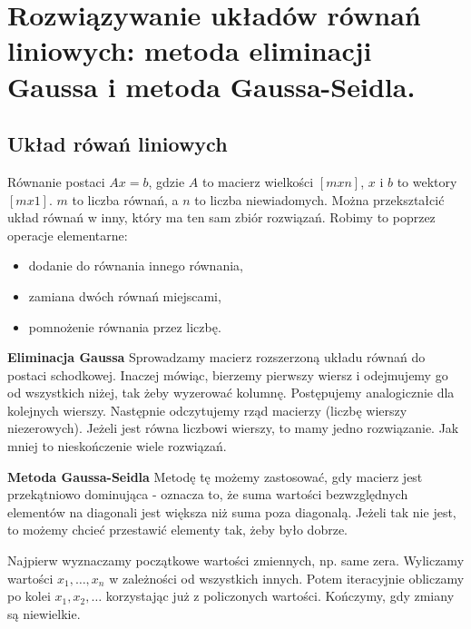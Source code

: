 \section{Rozwiązywanie układów równań liniowych: metoda eliminacji Gaussa i metoda Gaussa-Seidla.}

\subsection{Układ rówań liniowych}

Równanie postaci $Ax=b$, gdzie $A$ to macierz wielkości $[m x n]$, $x$ i $b$ to wektory $[m x 1]$.
$m$ to liczba równań, a $n$ to liczba niewiadomych.
Można przekształcić układ równań w inny, który ma ten sam zbiór rozwiązań.
Robimy to poprzez operacje elementarne:
\begin{itemize}[itemsep=0pt,partopsep=0pt, parsep=0pt]
    \item dodanie do równania innego równania,
    \item zamiana dwóch równań miejscami,
    \item pomnożenie równania przez liczbę.
\end{itemize}

\textbf{Eliminacja Gaussa}
Sprowadzamy macierz rozszerzoną układu równań do postaci schodkowej.
Inaczej mówiąc, bierzemy pierwszy wiersz i odejmujemy go od wszystkich niżej, tak żeby wyzerować kolumnę.
Postępujemy analogicznie dla kolejnych wierszy.
Następnie odczytujemy rząd macierzy (liczbę wierszy niezerowych).
Jeżeli jest równa liczbowi wierszy, to mamy jedno rozwiązanie.
Jak mniej to nieskończenie wiele rozwiązań.

\textbf{Metoda Gaussa-Seidla}
Metodę tę możemy zastosować, gdy macierz jest przekątniowo dominująca - oznacza to,
że suma wartości bezwzględnych elementów na diagonali jest większa niż suma poza diagonalą.
Jeżeli tak nie jest, to możemy chcieć przestawić elementy tak, żeby było dobrze.

Najpierw wyznaczamy początkowe wartości zmiennych, np. same zera.
Wyliczamy wartości $x_1,\ldots, x_n$ w zależności od wszystkich innych.
Potem iteracyjnie obliczamy po kolei $x_1, x_2, \ldots$ korzystając już z policzonych wartości.
Kończymy, gdy zmiany są niewielkie.
